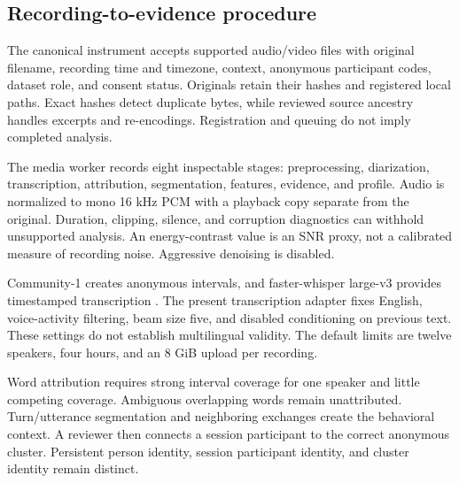 \documentclass{article}
\begin{document}
\subsection{Recording-to-evidence procedure}
The canonical instrument accepts supported audio/video files with original filename, recording time and timezone, context, anonymous participant codes, dataset role, and consent status. Originals retain their hashes and registered local paths. Exact hashes detect duplicate bytes, while reviewed source ancestry handles excerpts and re-encodings. Registration and queuing do not imply completed analysis.

The media worker records eight inspectable stages: preprocessing, diarization, transcription, attribution, segmentation, features, evidence, and profile. Audio is normalized to mono 16 kHz PCM with a playback copy separate from the original. Duration, clipping, silence, and corruption diagnostics can withhold unsupported analysis. An energy-contrast value is an SNR proxy, not a calibrated measure of recording noise. Aggressive denoising is disabled.

Community-1 creates anonymous intervals, and faster-whisper large-v3 provides timestamped transcription \cite{fasterwhisper}. The present transcription adapter fixes English, voice-activity filtering, beam size five, and disabled conditioning on previous text. These settings do not establish multilingual validity. The default limits are twelve speakers, four hours, and an 8 GiB upload per recording.

Word attribution requires strong interval coverage for one speaker and little competing coverage. Ambiguous overlapping words remain unattributed. Turn/utterance segmentation and neighboring exchanges create the behavioral context. A reviewer then connects a session participant to the correct anonymous cluster. Persistent person identity, session participant identity, and cluster identity remain distinct.
\end{document}
